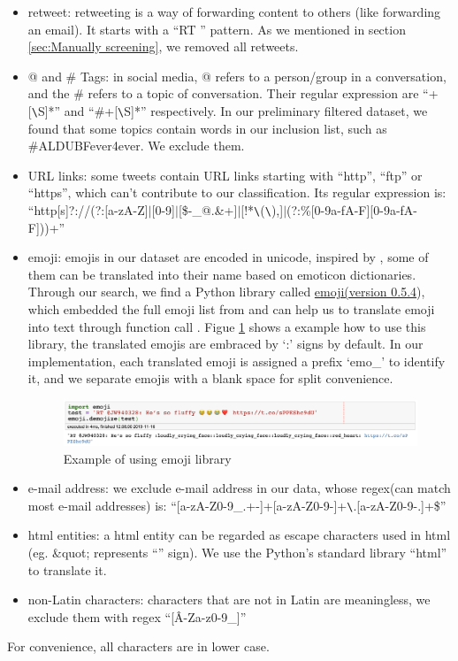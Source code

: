     \begin{itemize}
        \item retweet: retweeting is a way of forwarding content to others (like forwarding an email). It starts with a ``RT \@'' pattern. As we mentioned in section \ref{sec:Manually screening}, we removed all retweets.
        \item @ and \# Tags: in social media, @ refers to a person/group in a conversation, and the \# refers to a topic of conversation. Their regular expression are ``\@+[\verb|\|S]*'' and ``\#+[\verb|\|S]*'' respectively. In our preliminary filtered dataset, we found that some topics contain words in our inclusion list, such as \#ALDUBFever4ever. We exclude them. 
        \item URL links: some tweets contain URL links starting with ``http'', ``ftp'' or ``https'', which can't contribute to our classification. Its regular expression is:\\``http[s]?://(?:[a-zA-Z]$|$[0-9]$|$[\$-\_@.\&+]$|$[!*\verb|\|(\verb|\|),]$|$(?:\%[0-9a-fA-F][0-9a-fA-F]))+''
        \item emoji: emojis in our dataset are encoded in unicode, inspired by \cite{serban2019real}, some of them can be translated into their name based on emoticon dictionaries. Through our search, we find a Python library called \href{https://pypi.org/project/emoji/} {emoji(version 0.5.4}), which embedded the full emoji list from \cite{emo_list} and can help us to translate emoji into text through function call \cite{pytho_emo}. Figue \ref{fig:emo_lib} shows a example how to use this library, the translated emojis are embraced by `:' signs by default. In our implementation, each translated emoji is assigned a prefix `emo\_' to identify it, and we separate emojis with a blank space for split convenience.
        \begin{figure}[!htbp]
            \centering
            \includegraphics[width=5in]{images/emoji_lib.png}
            \caption{Example of using emoji library}
            \label{fig:emo_lib}
        \end{figure}
        \item e-mail address: we exclude e-mail address in our data, whose regex(can match most e-mail addresses) is:
        ``[a-zA-Z0-9\_.+-]+\@[a-zA-Z0-9-]+\verb|\|.[a-zA-Z0-9-.]+\$''
        \item html entities: a html entity can be regarded as escape characters used in html (eg. \&quot; represents ``'' sign). We use the Python's standard library ``html'' to translate it.
        \item non-Latin characters: characters that are not in Latin are meaningless, we exclude them with regex ``[\^A-Za-z0-9\_]'' 
    \end{itemize}
    For convenience, all characters are in lower case.

